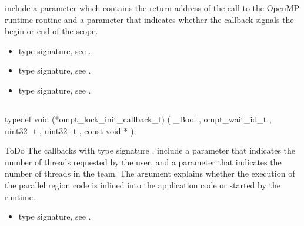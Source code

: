 include a parameter  which contains the return address of the
call to the OpenMP runtime routine and a parameter 
that indicates whether the callback signals the begin or end of the scope.

\crossreferences
\begin{itemize}
\item {} type signature, see
.
\item {} type signature, see
.
\item {} type signature, see
.
\end{itemize}



\subsection{}
\label{subsec:ompt_lock_init_callback_t}
\format
\begin{boxedcode}
typedef void (*ompt\_lock\_init\_callback\_t) (
  \_Bool ,
  ompt\_wait\_id\_t ,
  uint32\_t ,
  uint32\_t ,
  const void *
);
\end{boxedcode}
\descr ToDo
The callbacks with type signature ,
include a parameter 
that indicates the number of threads requested by the user, and a parameter
 that indicates the number of threads in the team.
The  argument explains whether the execution of the parallel
region code is inlined into the application code or started by the runtime.

\crossreferences
\begin{itemize}
\item {} type signature, see
.
\end{itemize}



